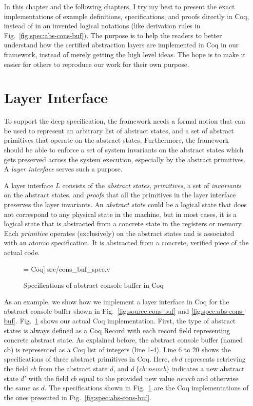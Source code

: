 In this chapter and the following chapters, I try my best to present the exact
implementations of example definitions, specifications, and proofs
directly in Coq, instead of in an invented logical notations
(like derivation rules in Fig.~\ref{fig:spec:abs-cons-buf}).
The purpose is to help the readers to better understand how the certified
abstraction layers are implemented in Coq in our framework, instead of
merely getting the high level ideas. The hope is to make it easier for others to
reproduce our work for their own purpose.


\section{Layer Interface}
\label{sec:layer_interface}
To support the deep specification, the framework needs a formal notion
that can be used to represent an arbitrary list of abstract states,
and a set of abstract primitives that operate on the abstract states. 
Furthermore, the framework should be able to enforce a set of system
invariants on the abstract states which gets preserved across
the system execution, especially by the abstract primitives.
A {\em layer interface} serves such a purpose.

A layer interface $L$ consists of the {\em abstract states}, {\em
  primitives}, a set of {\em invariants} on the abstract states, and
{\em proofs} that all the primitives in the layer interface preserves
the layer invariants.  An {\em abstract state} could be a logical
state that does not correspond to any physical state in the machine,
but in most cases, it is a logical state that is abstracted from a
concrete state in the registers or memory. Each {\em primitive}
operates (exclusively) on the abstract states and is associated with an atomic
specification. It is abstracted from a concrete, verified piece of the
actual code.  

\begin{figure}
 = Coq] {src/cons_buf_spec.v}
\caption{Specifications of abstract console buffer in Coq}
\label{fig:cons_buf_spec}
\end{figure}

As an example, we show how we implement a layer interface in Coq
for the abstract console buffer shown in Fig.~\ref{fig:source:cons-buf}
and \ref{fig:spec:abs-cons-buf}. Fig.~\ref{fig:cons_buf_spec} shows
our actual Coq implementation. First, the type of abstract states
is always defined as a Coq \textsf{Record} with each record field
representing concrete abstract state.
As explained before, the abstract console buffer (named \textsf{cb})
is represented as a Coq list of integers (line 1-4).
Line 6 to 20 shows the specifications of three abstract primitives
in Coq. Here, $cb~d$ represents retrieving the field $cb$ from the
abstract state $d$, and $d~\{cb: newcb\}$ indicates a new abstract state
$d'$ with the field $cb$ equal to the provided new value $newcb$ and
otherwise the same as $d$. The specifications shown in Fig.~\ref{fig:cons_buf_spec}
are the Coq implementations of the ones presented in Fig.~\ref{fig:spec:abs-cons-buf}.

